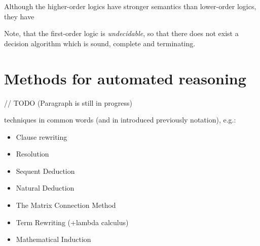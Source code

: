 \documentclass[article]{aaltoseries}
\begin{document}
Although the higher-order logics have stronger semantics than lower-order logics, they have 

Note, that the first-order logic is \textit{undecidable}, so that there does not exist a decision algorithm which is sound, complete and terminating.






\section{Methods for automated reasoning}
\label{sec:auto_reasoning}

// TODO (Paragraph is still in progress)

techniques in common words (and in introduced previously notation), e.g.: 
\begin{itemize}
\itemsep0em
	\item Clause rewriting
	\item Resolution
	\item Sequent Deduction
	\item Natural Deduction
	\item The Matrix Connection Method
	\item Term Rewriting (+lambda calculus)
	\item Mathematical Induction
\end{itemize}
\end{document}
